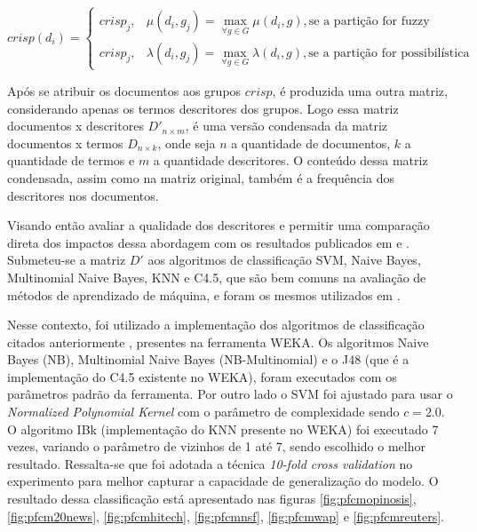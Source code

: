 \begin{equation}
  crisp(d_i) = \begin{cases}
    crisp_j, & \mu(d_i,g_j) = \displaystyle\max_{\forall g \in G} \mu(d_i,g), \text{se a partição
  for fuzzy}\\
  crisp_j, & \lambda(d_i,g_j) = \displaystyle\max_{\forall g \in G} \lambda(d_i,g), \text{se a
  partição for possibilística}
  \end{cases}
  \label{eq:class}
\end{equation}

Após se atribuir os documentos aos grupos $crisp$, é produzida uma outra matriz,
considerando apenas os termos descritores dos grupos. Logo essa matriz documentos x descritores
$D'_{n \times m}$, 
é uma versão condensada da matriz documentos x termos $D_{n \times k}$, onde seja $n$ a 
quantidade de documentos, $k$ a quantidade de termos e $m$ a quantidade descritores. O conteúdo
dessa matriz condensada, assim como na matriz original, também é a frequência dos descritores nos 
documentos. 

Visando então avaliar a qualidade dos descritores e permitir uma comparação direta dos impactos
dessa abordagem com os resultados publicados em  e
. Submeteu-se a matriz $D'$ 
aos algoritmos de classificação 
SVM, Naive Bayes, Multinomial Naive Bayes, KNN e C4.5, que são bem comuns na avaliação de 
métodos de aprendizado de máquina, e foram os mesmos utilizados em .

Nesse contexto, foi utilizado a implementação dos algoritmos de classificação citados anteriormente
, presentes na ferramenta WEKA\cite{weka}. Os algoritmos Naive Bayes (NB), Multinomial Naive Bayes
(NB-Multinomial) e o J48 (que é a implementação do C4.5 existente no WEKA), foram executados com os
parâmetros padrão da ferramenta. Por outro lado o SVM foi ajustado para usar o {\it Normalized
Polynomial Kernel\/} com o parâmetro de complexidade sendo $c = 2.0$. O algoritmo IBk (implementação
do KNN presente no WEKA) foi executado 7 vezes, variando o parâmetro de vizinhos de 1 até 7, sendo
escolhido o melhor resultado. Ressalta-se que foi adotada a técnica {\it 10-fold cross validation\/}
no experimento para melhor capturar a capacidade de generalização do modelo. O resultado dessa
classificação está apresentado nas figuras \ref{fig:pfcmopinosis},  \ref{fig:pfcm20news},
\ref{fig:pfcmhitech}, \ref{fig:pfcmnsf}, \ref{fig:pfcmwap} e \ref{fig:pfcmreuters}. 

